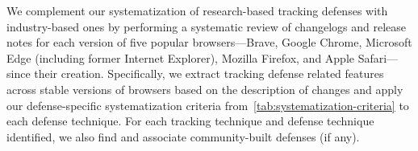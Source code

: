 We complement our systematization of research-based tracking defenses with industry-based ones by performing a systematic review of changelogs and release notes for each version of five popular browsers---Brave, Google Chrome, Microsoft Edge (including former Internet Explorer), Mozilla Firefox, and Apple Safari---since their creation.
%
Specifically, we extract tracking defense related features across stable versions of browsers based on the description of changes and apply our defense-specific systematization criteria from~\autoref{tab:systematization-criteria} to each defense technique.
%
For each tracking technique and defense technique identified, we also find and associate community-built defenses (if any).
















